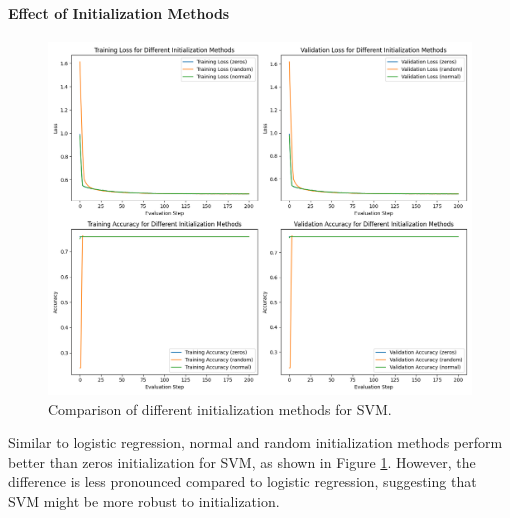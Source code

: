 \documentclass[journal, a4paper]{IEEEtran}
\begin{document}
\paragraph{Effect of Initialization Methods}
\begin{figure}[htbp]
\centering
\includegraphics[width=\linewidth]{svm_init_methods.png}
\caption{Comparison of different initialization methods for SVM.}
\label{fig:svm_init}
\end{figure}

Similar to logistic regression, normal and random initialization methods perform better than zeros initialization for SVM, as shown in Figure \ref{fig:svm_init}. However, the difference is less pronounced compared to logistic regression, suggesting that SVM might be more robust to initialization.
\end{document}
